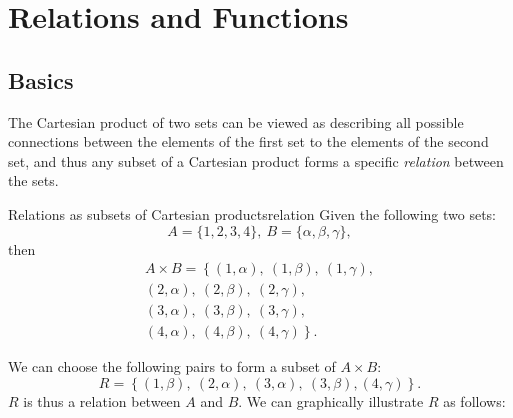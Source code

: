 \section{Relations and Functions}
\subsection{Basics}
The Cartesian product of two sets can be viewed as describing all possible connections between the elements of the first set to the elements of the second set, and thus any subset of a Cartesian product forms a specific \emph{relation} between the sets.

\begin{example}{Relations as subsets of Cartesian products}{relation}
	Given the following two sets:
	\[
		A=\{1,2,3,4\},\ B=\{\alpha,\beta,\gamma\},
	\]
	then
	\begin{align*}
		A\times B = \left\{ (1,\alpha),\ (1,\beta),\ (1,\gamma), \right.\\
												(2,\alpha),\ (2,\beta),\ (2,\gamma),\\
												(3,\alpha),\ (3,\beta),\ (3,\gamma),\\
							  \left.	(4,\alpha),\ (4,\beta),\ (4,\gamma) \right\}.
	\end{align*}

	We can choose the following pairs to form a subset of $A\times B$:
	\[
		R = \left\{ (1,\beta),\ (2,\alpha),\ (3,\alpha),\ (3,\beta), (4,\gamma)  \right\}.
	\]
	$R$ is thus a relation between $A$ and $B$. We can graphically illustrate $R$ as follows:
	\begin{figure}[H]
		\centering
	\end{figure}
\end{example}

